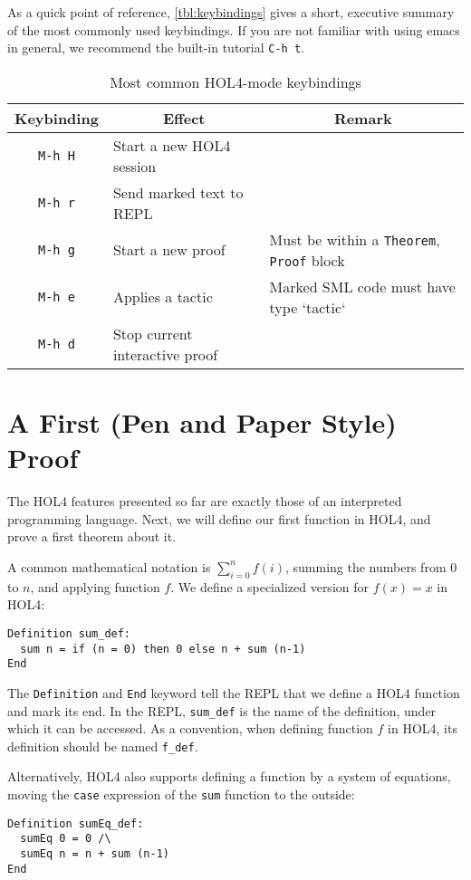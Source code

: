 \documentclass[10pt]{scrartcl}
\newcommand{\ekey}[1]{\texttt{#1}}
\begin{document}
As a quick point of reference, \autoref{tbl:keybindings} gives a short, executive summary of the most commonly used keybindings.
If you are not familiar with using emacs in general, we recommend the built-in
tutorial \ekey{C-h t}.

\begin{table}
  \centering
\begin{tabular}{@{}cll@{}}
  \toprule
  Keybinding & \multicolumn{1}{c}{Effect} & \multicolumn{1}{c}{Remark}\\
  \midrule
  \ekey{M-h H} & Start a new HOL4 session & \\
  \ekey{M-h r} & Send marked text to REPL & \\
  \ekey{M-h g} & Start a new proof & Must be within a \texttt{Theorem}, \texttt{Proof} block\\
  \ekey{M-h e} & Applies a tactic & Marked SML code must have type `tactic`\\
  \ekey{M-h d} & Stop current interactive proof \\
  \bottomrule
\end{tabular}
  \caption{Most common HOL4-mode keybindings}\label{tbl:keybindings}
\end{table}

\section{A First (Pen and Paper Style) Proof}\label{sec:hol_ex1}
%
The HOL4 features presented so far are exactly those of an interpreted
programming language.
Next, we will define our first function in HOL4, and prove a first theorem about
it.

A common mathematical notation is $\sum_{i=0}^n f (i)$,
summing the numbers from $0$ to $n$, and applying function $f$.
We define a specialized version for $f (x) = x$ in HOL4:

\begin{lstlisting}
Definition sum_def:
  sum n = if (n = 0) then 0 else n + sum (n-1)
End
\end{lstlisting}

The \lstinline{Definition} and \lstinline{End} keyword tell the REPL that we
define a HOL4 function and mark its end.
In the REPL, \lstinline{sum_def} is the name of the definition, under which it
can be accessed.
As a convention, when defining function $f$ in HOL4, its definition should be
named \lstinline{f_def}.

Alternatively, HOL4 also supports defining a function by a system of equations,
moving the \texttt{case} expression of the \lstinline{sum} function to the
outside:
\begin{lstlisting}
Definition sumEq_def:
  sumEq 0 = 0 /\
  sumEq n = n + sum (n-1)
End
\end{lstlisting}
\end{document}
